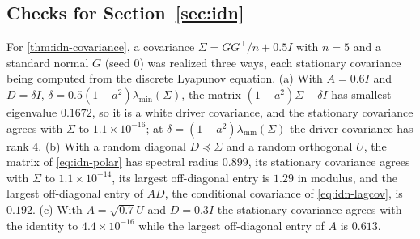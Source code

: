 \subsection{Checks for \texorpdfstring{Section~\ref{sec:idn}}{unrecorded drivers}}\label{chk:idn}


\begin{numcheck}\label{chk:idn-covariance}
For \cref{thm:idn-covariance}, a covariance $\Sigma=GG^{\top}/n+0.5I$ with $n=5$ and a standard normal $G$ (seed 0) was realized three ways, each stationary covariance being computed from the discrete Lyapunov equation. (a) With $A=0.6I$ and $D=\delta I$, $\delta=0.5(1-a^2)\lambda_{\min}(\Sigma)$, the matrix $(1-a^2)\Sigma-\delta I$ has smallest eigenvalue $0.1672$, so it is a white driver covariance, and the stationary covariance agrees with $\Sigma$ to $1.1\times10^{-16}$; at $\delta=(1-a^2)\lambda_{\min}(\Sigma)$ the driver covariance has rank 4. (b) With a random diagonal $D\preceq\Sigma$ and a random orthogonal $U$, the matrix of \cref{eq:idn-polar} has spectral radius $0.899$, its stationary covariance agrees with $\Sigma$ to $1.1\times10^{-14}$, its largest off-diagonal entry is $1.29$ in modulus, and the largest off-diagonal entry of $AD$, the conditional covariance of \cref{eq:idn-lagcov}, is $0.192$. (c) With $A=\sqrt{0.7}U$ and $D=0.3I$ the stationary covariance agrees with the identity to $4.4\times10^{-16}$ while the largest off-diagonal entry of $A$ is $0.613$.
\end{numcheck}

